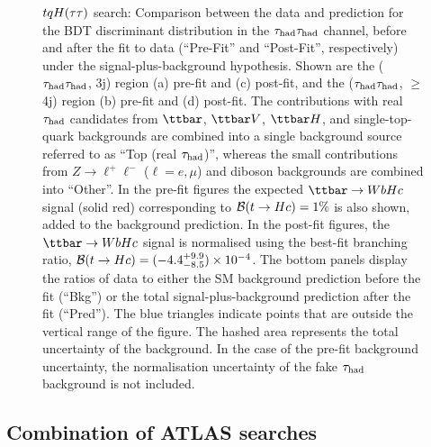\begin{figure}[htbp]
\begin{center}
\caption{\small{$tqH(\tau\tau)$ search: Comparison between the data and prediction for the BDT discriminant distribution in the 
$\tau_{\mathrm{had}} \tau_{\mathrm{had}}$ channel, before and after the fit to data  (``Pre-Fit'' and ``Post-Fit'', respectively) under the signal-plus-background hypothesis.
Shown are the ($\tau_{\mathrm{had}} \tau_{\mathrm{had}}$, 3j) region (a) pre-fit and (c) post-fit, and the ($\tau_{\mathrm{had}} \tau_{\mathrm{had}}$, $\geq$4j) region (b) pre-fit and (d) post-fit.
The contributions with real $\tau_{\mathrm{had}}$ candidates from $\ttbar$,  $\ttbar V$, $\ttbar H$, and single-top-quark backgrounds are combined into
a single background source referred to as ``Top (real $\tau_{\mathrm{had}}$)'', whereas the small contributions from 
$Z\to \ell^+\ell^-$ ($\ell = e, \mu$) and diboson backgrounds are combined into ``Other''. 
In the pre-fit figures the expected $\Hc$ signal (solid red) corresponding to $\mathcal{B}(t\to Hc)=1\%$ is also shown,
added to the background prediction. In the post-fit figures, the $\Hc$ signal is normalised using the best-fit branching ratio, 
$\mathcal{B}(t\to Hc)=(-4.4^{+9.9}_{-8.5})\times 10^{-4}$.
The bottom panels display the ratios of data to either the SM background prediction before the fit (``Bkg'')  or the total signal-plus-background
prediction after the fit (``Pred''). 
The blue triangles indicate points that are outside the vertical range of the figure. 
The hashed area represents the total uncertainty of the background. 
In the case of the pre-fit background uncertainty, the normalisation uncertainty of the fake $\tau_{\mathrm{had}}$ background is not included.}}
\label{fig:prepostfit_unblinded_WbHc_hh}
\end{center}
\end{figure}

\subsection{Combination of ATLAS searches}
\label{sec:results_combo}

